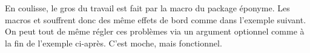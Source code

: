 \documentclass[theme = color]{tutodoc}
\begin{document}
\begin{tdocwarn}
    En coulisse, le gros du travail est fait par la macro  du package éponyme.
    Les macros  et  souffrent donc des même effets de bord comme dans l'exemple suivant.
    On peut tout de même régler ces problèmes via un argument optionnel  comme à la fin de l'exemple ci-après. C'est moche, mais fonctionnel.

\end{tdocwarn}
\end{document}
